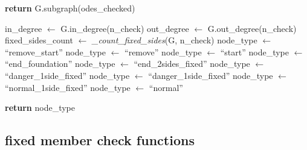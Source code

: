 \begin{algorithm*}
\begin{algorithmic}[1]
            \State
            \State \textbf{return} G.subgraph(odes\_checked)
        \EndFunction
        \end{algorithmic}
        \vspace{0.2em}
        \begin{algorithmic}[1]
            \State in\_degree $\gets$ G.in\_degree(n\_check)
            \State out\_degree $\gets$ G.out\_degree(n\_check)
            \State fixed\_sides\_count $\gets$ \textit{\_count\_fixed\_sides}(G, n\_check)
            \State 
                \State node\_type $\gets$ ``remove\_start''
                \State node\_type $\gets$ ``remove''
                \State node\_type $\gets$ ``start''
                \State node\_type $\gets$ ``end\_foundation''
                \State node\_type $\gets$ ``end\_2sides\_fixed''
                    \State node\_type $\gets$ ``danger\_1side\_fixed''
                    \State node\_type $\gets$ ``danger\_1side\_fixed''
                \Else
                    \State node\_type $\gets$ ``normal\_1side\_fixed''
                \EndIf
            \Else
                \State node\_type $\gets$ ``normal''
            \EndIf

            \State
            \State \textbf{return} node\_type
        \EndFunction
        \end{algorithmic}
    \end{algorithm*}

\newpage
\subsection{fixed member check functions} \label{sec:appendixa_2}

